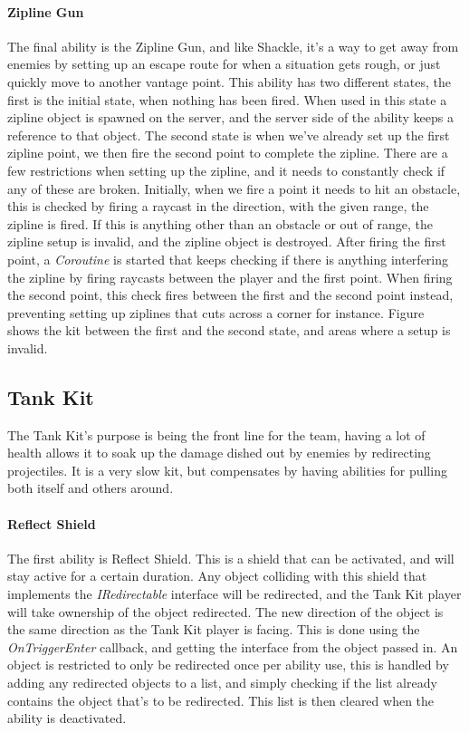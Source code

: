 \paragraph{Zipline Gun}
The final ability is the Zipline Gun, and like Shackle, it's a way to get away from enemies by setting up an escape route for when a situation gets rough, or just quickly move to another vantage point. This ability has two different states, the first is the initial state, when nothing has been fired. When used in this state a zipline object is spawned on the server, and the server side of the ability keeps a reference to that object. The second state is when we've already set up the first zipline point, we then fire the second point to complete the zipline. There are a few restrictions when setting up the zipline, and it needs to constantly check if any of these are broken. Initially, when we fire a point it needs to hit an obstacle, this is checked by firing a raycast in the direction, with the given range, the zipline is fired. If this is anything other than an obstacle or out of range, the zipline setup is invalid, and the zipline object is destroyed. After firing the first point, a \emph{Coroutine} is started that keeps checking if there is anything interfering the zipline by firing raycasts between the player and the first point. When firing the second point, this check fires between the first and the second point instead, preventing setting up ziplines that cuts across a corner for instance. Figure~ shows the kit between the first and the second state, and areas where a setup is invalid.

\subsection{Tank Kit}
The Tank Kit's purpose is being the front line for the team, having a lot of health allows it to soak up the damage dished out by enemies by redirecting projectiles. It is a very slow kit, but compensates by having abilities for pulling both itself and others around.

\paragraph{Reflect Shield}
The first ability is Reflect Shield. This is a shield that can be activated, and will stay active for a certain duration. Any object colliding with this shield that implements the \emph{IRedirectable} interface will be redirected, and the Tank Kit player will take ownership of the object redirected. The new direction of the object is the same direction as the Tank Kit player is facing. This is done using the \emph{OnTriggerEnter} callback, and getting the interface from the object passed in. An object is restricted to only be redirected once per ability use, this is handled by adding any redirected objects to a list, and simply checking if the list already contains the object that's to be redirected. This list is then cleared when the ability is deactivated.

